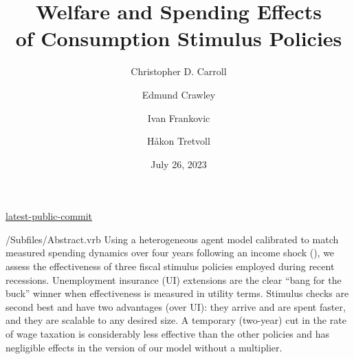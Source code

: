 \documentclass[HAFiscal]{subfiles}
\begin{document}
\hfill{\tiny \href{https://github.com/llorracc/HAFiscal/blob/master/Resources/.git-public-commit}{latest-public-commit}}

\title{Welfare and Spending Effects \\ of Consumption Stimulus Policies}

\author{Christopher D. Carroll\authNum \and Edmund Crawley\authNum \and Ivan Frankovic\authNum \and H{\aa}kon Tretvoll\authNum}

\keywords{}


\renewcommand{\forcedate}{July 26, 2023}\date{\forcedate}

\maketitle
\hypertarget{abstract}{}
\begin{verbatimwrite}{\econtexRoot/Subfiles/Abstract.vrb}
  Using a heterogeneous agent model calibrated to match measured spending dynamics over four years following an income shock (\cite{fagereng_mpc_2021}), we assess the effectiveness of three fiscal stimulus policies employed during recent recessions.  Unemployment insurance (UI) extensions are the clear ``bang for the buck'' winner when effectiveness is measured in utility terms.  Stimulus checks are second best and have two advantages (over UI): they arrive and are spent faster, and they are scalable to any desired size.  A temporary (two-year) cut in the rate of wage taxation is considerably less effective than the other policies and has negligible effects in the version of our model without a multiplier.
\end{verbatimwrite}


\hypertarget{links}{}
\end{document}
